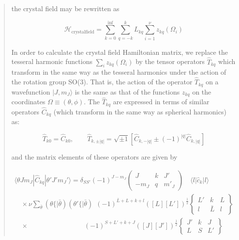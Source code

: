 \begin{quotation}
the crystal field may be rewritten as

\begin{equation}
\mathcal H_{\mathrm{crystalfield}}=  \sum_{k=0}^{\inf} \sum_{q=-k}^k  L_{kq} \sum_{i=1}^\nu z_{kq}(\Omega_i)
\end{equation}

In order to calculate the crystal field Hamiltonian matrix, we replace the tesseral harmonic
functions $\sum_i z_{kq}(\Omega_i)$ by the tensor operators $\hat{T}_{kq}$ which transform in the
same way as the tesseral harmonics under the action of the rotation group SO(3). That is, the action
of the operator $\hat{T}_{kq}$ on a wavefunction $|J,m_J\rangle$ is the same as that of the
functions $z_{kq}$ on the coordinates $\Omega \equiv (\theta,\phi)$. The $\hat{T}_{kq}$ are
expressed in terms of similar operators $\hat{C}_{kq}$ (which transform in the same way as spherical
harmonics) as:

\begin{equation} \label{tkqhermitian}
  \hat{T}_{k0} = \hat{C}_{k0}, \qquad \hat{T}_{k,\pm|q|} = \sqrt{\pm 1} \left[
  \hat{C}_{k,-|q|} \pm (-1)^{|q|} \hat{C}_{k,|q|} \right]
\end{equation}

\noindent and the matrix elements of these operators are given by 

\begin{equation} \label{iccfmatel}
\begin{array}{l}
\langle \theta J m_J | \hat{C}_{kq} | \theta' J' m_J' \rangle = \delta_{SS'} (-1)^{J-m_J}
       \left( \begin{array}{ccc} J & k & J' \\ -m_J & q & m'_J \end{array} \right)
       \quad \langle l | \hat{c}_k | l \rangle  \\
 \quad \times \nu \sum_{\bar{\theta}} (\theta\{|\bar{\theta}) (\theta'\{|\bar{\theta})
       \ \  (-1)^{\bar{L}+L+k+l} ([L][L'])^{\frac{1}{2}}
       \left\{ \begin{array}{ccc} L' & k & L \\ l & \bar{L} & l \end{array} \right\}  \\
 \quad \times \qquad\qquad\qquad\qquad\  (-1)^{S+L'+k+J} ([J][J'])^{\frac{1}{2}}
       \left\{ \begin{array}{ccc} J' & k & J \\ L & S & L' \end{array} \right\}
\end{array}
\end{equation}


\end{quotation}
